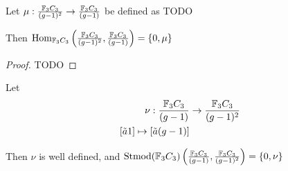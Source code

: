 \begin{theorem} \label{thm:f_3c_3_mu}
    Let \( \mu: \frac{{\mathbb{F}}_3C_3}{(g - 1)^2} \to \frac{{\mathbb{F}}_3C_3}{(g - 1)} \) be defined as TODO

    Then \( \operatorname{Hom}_{{\mathbb{F}}_3C_3}\left(\frac{{\mathbb{F}}_3C_3}{(g - 1)^2}, \frac{{\mathbb{F}}_3C_3}{(g - 1)}\right) = \left\{0, \mu\right\} \)
\end{theorem}
\begin{proof}
    TODO
\end{proof}

\begin{theorem} \label{thm:f_3c_3_nu} %
    Let 
    \begin{align*}
        \nu: \frac{{\mathbb{F}}_3C_3}{(g - 1)} &\to \frac{{\mathbb{F}}_3C_3}{(g - 1)^2} \\
        [\tilde{a}1] \mapsto [\tilde{a}(g - 1)]
    \end{align*}

    Then \( \nu \) is well defined, and \( \operatorname{Stmod}({\mathbb{F}}_3C_3)\left(\frac{{\mathbb{F}}_3C_3}{(g - 1)}, \frac{{\mathbb{F}}_3C_3}{(g - 1)^2}\right) = \left\{0, \nu\right\} \)
\end{theorem}
